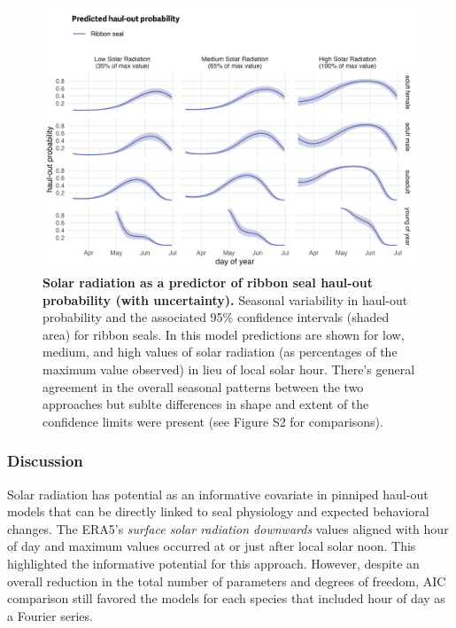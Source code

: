 \documentclass[fleqn,10pt,lineno]{wlpeerj} %
\begin{document}
\begin{figure}
\includegraphics[width=1\linewidth]{../figures/Figure-018} \caption{\textbf{Solar radiation as a predictor of ribbon seal haul-out probability (with uncertainty).} \linebreak Seasonal variability in haul-out probability and the associated 95\% confidence intervals (shaded area) for ribbon seals. In this model predictions are shown for low, medium, and high values of solar radiation (as percentages of the maximum value observed) in lieu of local solar hour. There's general agreement in the overall seasonal patterns between the two approaches but sublte differences in shape and extent of the confidence limits were present (see Figure S2 for comparisons).}\label{fig:ssrd-ribbonPredSE}
\end{figure}

\subsubsection{Discussion}\label{discussion-1}

Solar radiation has potential as an informative covariate in pinniped haul-out
models that can be directly linked to seal physiology and expected behavioral
changes. The ERA5's \emph{surface solar radiation downwards} values aligned with hour
of day and maximum values occurred at or just after local solar noon. This
highlighted the informative potential for this approach. However, despite an
overall reduction in the total number of parameters and degrees of freedom, AIC
comparison still favored the models for each species that included hour of day
as a Fourier series.
\end{document}
